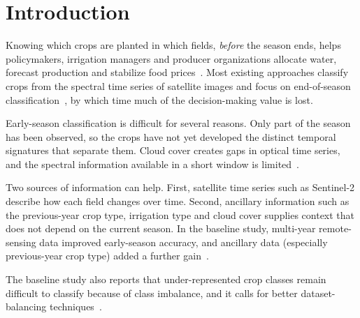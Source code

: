 \section{Introduction}
\label{sec:intro}

Knowing which crops are planted in which fields, \emph{before} the season ends, helps policymakers, irrigation managers and producer organizations allocate water, forecast production and stabilize food prices~\cite{genemola2026}. Most existing approaches classify crops from the spectral time series of satellite images and focus on end-of-season classification~\cite{genemola2026}, by which time much of the decision-making value is lost.

Early-season classification is difficult for several reasons. Only part of the season has been observed, so the crops have not yet developed the distinct temporal signatures that separate them. Cloud cover creates gaps in optical time series, and the spectral information available in a short window is limited~\cite{genemola2026}. 

Two sources of information can help. First, satellite time series such as Sentinel-2 describe how each field changes over time. Second, ancillary information such as the previous-year crop type, irrigation type and cloud cover supplies context that does not depend on the current season. In the baseline study, multi-year remote-sensing data improved early-season accuracy, and ancillary data (especially previous-year crop type) added a further gain~\cite{genemola2026}. 

The baseline study also reports that under-represented crop classes remain difficult to classify because of class imbalance, and it calls for better dataset-balancing techniques~\cite{genemola2026}. 

